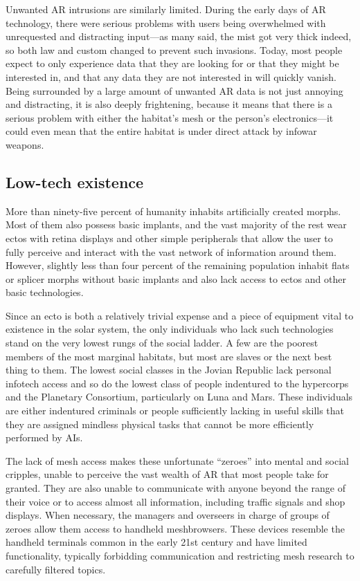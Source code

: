 Unwanted AR intrusions are similarly limited.  During the early days
of AR technology, there were serious problems with users being
overwhelmed with unrequested and distracting input—as many said, the
mist got very thick indeed, so both law and custom changed to prevent
such invasions. Today, most people expect to only experience data that
they are looking for or that they might be interested in, and that any
data they are not interested in will quickly vanish. Being surrounded
by a large amount of unwanted AR data is not just annoying and
distracting, it is also deeply frightening, because it means that
there is a serious problem with either the habitat's mesh or the
person's electronics—it could even mean that the entire habitat is
under direct attack by infowar weapons.

\subsection{Low-tech existence}
\label{sec:low-tech-existence}

More than ninety-five percent of humanity inhabits artificially
created morphs. Most of them also possess basic implants, and the vast
majority of the rest wear ectos with retina displays and other simple
peripherals that allow the user to fully perceive and interact with
the vast network of information around them.  However, slightly less
than four percent of the remaining population inhabit flats or splicer
morphs without basic implants and also lack access to ectos and other
basic technologies.

Since an ecto is both a relatively trivial expense and a piece of
equipment vital to existence in the solar system, the only individuals
who lack such technologies stand on the very lowest rungs of the
social ladder.  A few are the poorest members of the most marginal
habitats, but most are slaves or the next best thing to them. The
lowest social classes in the Jovian Republic lack personal infotech
access and so do the lowest class of people indentured to the
hypercorps and the Planetary Consortium, particularly on Luna and
Mars.  These individuals are either indentured criminals or people
sufficiently lacking in useful skills that they are assigned mindless
physical tasks that cannot be more efficiently performed by AIs.

The lack of mesh access makes these unfortunate “zeroes” into mental
and social cripples, unable to perceive the vast wealth of AR that
most people take for granted. They are also unable to communicate with
anyone beyond the range of their voice or to access almost all
information, including traffic signals and shop displays. When
necessary, the managers and overseers in charge of groups of zeroes
allow them access to handheld meshbrowsers. These devices resemble the
handheld terminals common in the early 21st century and have limited
functionality, typically forbidding communication and restricting mesh
research to carefully filtered topics.

